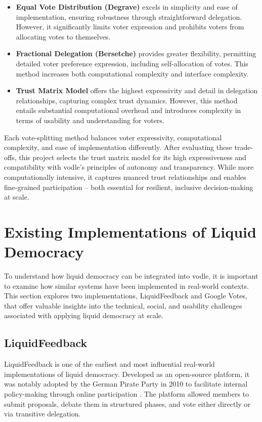 \begin{itemize}
  \item \textbf{Equal Vote Distribution (Degrave)} excels in simplicity and ease of implementation, ensuring robustness through straightforward delegation. However, it significantly limits voter expression and prohibits voters from allocating votes to themselves.
  \item \textbf{Fractional Delegation (Bersetche)} provides greater flexibility, permitting detailed voter preference expression, including self-allocation of votes. This method increases both computational complexity and interface complexity.
  \item \textbf{Trust Matrix Model} offers the highest expressivity and detail in delegation relationships, capturing complex trust dynamics. However, this method entails substantial computational overhead and introduces complexity in terms of usability and understanding for voters.
\end{itemize}

Each vote-splitting method balances voter expressivity, computational complexity, and ease of implementation differently. After evaluating these trade-offs, this project selects the trust matrix model for its high expressiveness and compatibility with vodle's principles of autonomy and transparency. While more computationally intensive, it captures nuanced trust relationships and enables fine-grained participation -- both essential for resilient, inclusive decision-making at scale.

\section{Existing Implementations of Liquid Democracy}
To understand how liquid democracy can be integrated into vodle, it is important to examine how similar systems have been implemented in real-world contexts. 
This section explores two implementations, LiquidFeedback and Google Votes, that offer valuable insights into the technical, social, and usability challenges associated with applying liquid democracy at scale.
\subsection{LiquidFeedback}
LiquidFeedback is one of the earliest and most influential real-world implementations of liquid democracy. Developed as an open-source platform, it was notably adopted by the German Pirate Party in 2010 to facilitate internal policy-making through online participation \citep{behrens_liquidfeedback_2014}. The platform allowed members to submit proposals, debate them in structured phases, and vote either directly or via transitive delegation.


